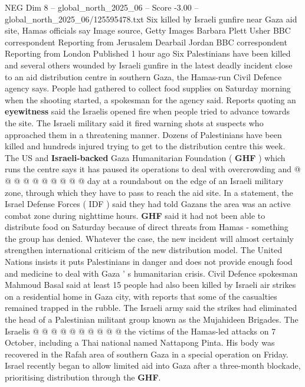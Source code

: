 \begin{textsample}{NEG Dim 8 – global\_north\_2025\_06 – Score -3.00 – global\_north\_2025\_06/125595478.txt}  \label{ex:f8_neg_023}
Six killed by Israeli gunfire near Gaza aid site, Hamas officials say Image source, Getty Images Barbara Plett Usher BBC correspondent Reporting from Jerusalem Dearbail Jordan BBC correspondent Reporting from London Published 1 hour ago Six Palestinians have been killed and several others wounded by Israeli gunfire in the latest deadly incident close to an aid distribution centre in southern Gaza, the Hamas-run Civil Defence agency says.
People had gathered to collect food supplies on Saturday morning when the shooting started, a spokesman for the agency said.
Reports quoting an \textbf{eyewitness} said the Israelis opened fire when people tried to advance towards the site.
The Israeli military said it fired warning shots at suspects who approached them in a threatening manner.
Dozens of Palestinians have been killed and hundreds injured trying to get to the distribution centre this week.
The US and \textbf{Israeli-backed} Gaza Humanitarian Foundation ( \textbf{GHF} ) which runs the centre says it has paused its operations to deal with overcrowding and @ @ @ @ @ @ @ @ @ @ day at a roundabout on the edge of an Israeli military zone, through which they have to pass to reach the aid site.
In a statement, the Israel Defense Forces ( IDF ) said they had told Gazans the area was an active combat zone during nighttime hours. \textbf{GHF} said it had not been able to distribute food on Saturday because of direct threats from Hamas - something the group has denied.
Whatever the case, the new incident will almost certainly strengthen international criticism of the new distribution model.
The United Nations insists it puts Palestinians in danger and does not provide enough food and medicine to deal with Gaza ' s humanitarian crisis.
Civil Defence spokesman Mahmoud Basal said at least 15 people had also been killed by Israeli air strikes on a residential home in Gaza city, with reports that some of the casualties remained trapped in the rubble.
The Israeli army said the strikes had eliminated the head of a Palestinian militant group known as the Mujahideen Brigades.
The Israelis @ @ @ @ @ @ @ @ @ @ the victims of the Hamas-led attacks on 7 October, including a Thai national named Nattapong Pinta.
His body was recovered in the Rafah area of southern Gaza in a special operation on Friday.
Israel recently began to allow limited aid into Gaza after a three-month blockade, prioritising distribution through the \textbf{GHF}.

\end{textsample}
